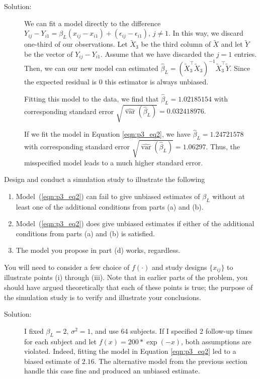 \documentclass[11pt, letterpaper]{article}
\begin{document}
{\begin{enumerate}[(a)]
\begin{description}
\item[Solution:] We can fit a model directly to the difference
  $Y_{ij} - Y_{i1} = \beta_L\left(x_{ij}- x_{i1}\right) + \left(\epsilon_{ij} -
    \epsilon_{i1}\right)$, $j \neq 1$. In this way, we discard one-third of our
  observations. Let $\tilde{X}_3$ be the third column of $\tilde{X}$ and let
  $\tilde{Y}$ be the vector of $Y_{ij}- Y_{i1}$. Assume that we have discarded
  the $j = 1$ entries. Then, we can our new model can estimated
  $\hat{\beta}_L =
  \left(\tilde{X}_3^\intercal\tilde{X}_3\right)^{-1}\tilde{X}_3^\intercal\tilde{Y}$.
  Since the expected residual is $0$ this estimator is always unbiased.

  Fitting this model to the data, we find that
  $\boxed{\hat{\beta}_L = 1.02185154}$ with corresponding standard error
  $\boxed{\sqrt{\hat{\operatorname{var}}\left(\hat{\beta}_L\right)} =
    0.032418976.}$

  If we fit the model in Equation \ref{eqn:p3_eq2}, we have
  $\boxed{\hat{\beta}_L = 1.24721578}$ with corresponding standard error
  $\boxed{\sqrt{\hat{\operatorname{var}}\left(\hat{\beta}_L\right)} = 1.06297.}$
  Thus, the misspecified model leads to a much higher standard error.
\end{description}

{\em \item Design and conduct a simulation study to illustrate the following 
\begin{enumerate}
\item Model~(\ref{eqn:p3_eq2}) can fail to give unbiased estimates of $\beta_L$ without at least one of the additional conditions from parts (a) and (b).
\item Model~(\ref{eqn:p3_eq2}) does give unbiased estimates if either of the additional conditions from parts (a) and (b) is satisfied.
\item The model you propose in part (d) works, regardless.
\end{enumerate}
You will need to consider a few choice of $f(\cdot)$ and study designs $\{x_{ij}\}$
to illustrate points (i) through (iii).  Note that in earlier parts of the problem, you should have 
argued theoretically that each of these points is true; the purpose of the simulation study is to verify
and illustrate your conclusions. }

\begin{description}
\item[Solution:] I fixed $\beta_L = 2$, $\sigma^2 = 1$, and use 64
  subjects. If I specified 2 follow-up times for each subject and let
  $f\left(x\right) = 200*\exp\left(-x\right)$, both assumptions are
  violated. Indeed, fitting the model in Equation \ref{eqn:p3_eq2} led to a
  biased estimate of $2.16$. The alternative model from the previous section
  handle this case fine and produced an unbiased estimate.


\end{description}
\end{enumerate}}
\end{document}
